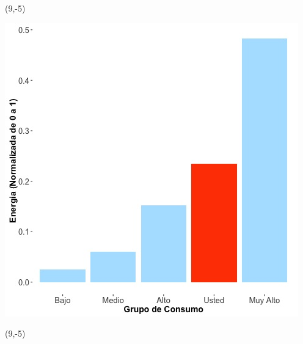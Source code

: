 \documentclass{article}\usepackage[]{graphicx}\usepackage[]{color}
\newenvironment{knitrout}{}{} %
\begin{document}
 \begin{textblock}{1}(9,-5)
\begin{minipage}{20em}
\begingroup

\endgroup
\end{minipage}
\end{textblock}


\begin{knitrout}
\color{fgcolor}
\includegraphics[scale=0.65]{figure/A16_neighbor_plot} 
\end{knitrout}

 \begin{textblock}{1}(9,-5)
\begin{minipage}{20em}
\begingroup

\endgroup
\end{minipage}
\end{textblock}
\end{document}
